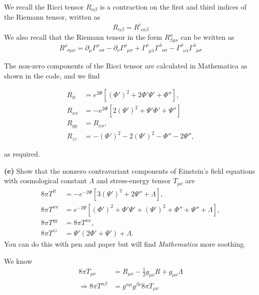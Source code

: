 \documentclass[a4paper]{article} %
\newcommand{\ph}[1]{\phantom{#1}}
\begin{document}
We recall the Ricci tensor $R_{\alpha\beta}$ is a contraction on the first and third indices of the Riemann tensor, written as
\begin{equation}
R_{\alpha\beta}=R^{i}_{\ph{i}\alpha i \beta}
\end{equation}
We also recall that the Riemann tensor in the form $R^{\alpha}_{\beta\mu\nu}$ can be written as
\begin{equation}
R^{\rho}_{\ph{\rho}\sigma \mu\nu}=\partial_{\mu}\Gamma^{\rho}_{\ph{\rho}\nu\sigma}
-\partial_{\nu}\Gamma^{\rho}_{\ph{\rho}\mu\sigma}
+\Gamma^{\rho}_{\ph{\rho}\mu\lambda}\Gamma^{\lambda}_{\ph{\lambda}\nu \sigma}
-\Gamma^{\rho}_{\ph{\rho}\nu\lambda}\Gamma^{\lambda}_{\ph{\lambda}\mu\sigma}
\end{equation}

The non-zero components of the Ricci tensor are calculated in Mathematica as shown in the code, and we find

\begin{align}
R_{tt}&=e^{2\Phi}[(\Phi')^2+2\Phi' \Psi' +\Phi''],\\
R_{xx}&=-e^{2\Phi}[2(\Psi')^2+\Psi' \Phi' + \Psi'']\\
R_{yy}&=R_{xx},\\
R_{zz}&=-(\Phi')^2-2(\Psi')^2-\Phi''-2\Psi'',
\end{align}

as required.


\begin{framed}
\textbf{(e)} Show that the nonzero contravariant components of Einstein’s field equations with
cosmological constant $\Lambda$ and stress-energy tensor $T_{\mu\nu}$ are
\begin{align}
8\pi T^{tt}&=-e^{-2\Phi}[3(\Psi')^2+2\Psi''+\Lambda],\\
8\pi T^{xx}&=e^{-2\Psi}[(\Phi')^2+\Phi' \Psi' + (\Psi')^2+\Phi'' + \Psi'' + \Lambda],\\
8\pi T^{yy}&=8\pi T^{xx},\\
8\pi T^{zz}&=\Psi'(2\Phi' + \Psi')+\Lambda.
\end{align}
You can do this with pen and paper but will find \emph{Mathematica} more soothing.
\end{framed}

We know
\begin{align}
8\pi T_{\mu\nu}&=R_{\mu\nu}-\frac{1}{2}g_{\mu\nu}R+g_{\mu\nu}\Lambda\\
\Rightarrow 8\pi T^{\alpha\beta}&=g^{\alpha\mu}g^{\beta\nu}8\pi T_{\mu\nu}
\end{align}
\end{document}
